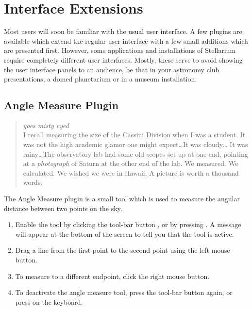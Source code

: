 
\chapter{Interface Extensions}
\label{ch:plugins:Interfaces}

Most users will soon be familiar with the usual user interface. A few
plugins are available which extend the regular user interface with a
few small additions which are presented first.  However, some
applications and installations of Stellarium require completely
different user interfaces. Mostly, these serve to avoid showing the
user interface panels to an audience, be that in your astronomy club
presentations, a domed planetarium or in a museum installation.


\section{Angle Measure Plugin}
\label{sec:plugins:AngleMeasure}

\begin{quotation}\small
\noindent\emph{goes misty eyed}\\ 
I recall measuring the size of the Cassini Division when I was a student.
It was not the high academic glamor one might expect\ldots It was cloudy\ldots
It was rainy\ldots The observatory lab had some old scopes set up at one
end, pointing at a \emph{photograph} of Saturn at the other end of the
lab. We measured. We calculated. We wished we were in Hawaii. A picture
is worth a thousand words.
\end{quotation}


\noindent The Angle Measure plugin is a small tool which is used to measure the
angular distance between two points on the sky. 



\begin{enumerate}
\item Enable the tool by clicking the tool-bar button
  , or by pressing
  . A message will appear at the bottom of the screen to
  tell you that the tool is active.
\item Drag a line from the first point to the second point using the
  left mouse button.
\item To measure to a different endpoint, click the right mouse button.
\item To deactivate the angle measure tool, press the tool-bar button
  again, or press  on the keyboard.
\end{enumerate}

